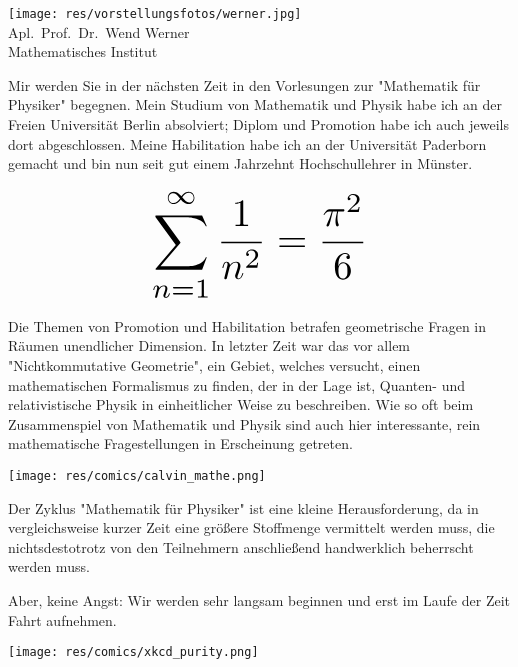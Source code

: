 \begin{multicols}{2}
\begin{center}
\texttt{[image: res/vorstellungsfotos/werner.jpg]}\\
Apl.\ Prof.\ Dr.\ Wend Werner\\
Mathematisches Institut
\end{center}

Mir werden Sie in der nächsten Zeit in den Vorlesungen zur "Mathematik für Physiker" begegnen. Mein Studium von Mathematik und Physik habe ich an der Freien Universität Berlin absolviert; Diplom und Promotion habe ich auch jeweils dort abgeschlossen. Meine Habilitation habe ich an der Universität Paderborn gemacht und bin nun seit gut einem Jahrzehnt Hochschullehrer in Münster.

\[
\resizebox{0.45\hsize}{!}{$\displaystyle\sum_{n = 1}^\infty \frac{1}{n^2} = \frac{\pi^2}{6}$}
\]

Die Themen von Promotion und Habilitation betrafen geometrische Fragen in Räumen unendlicher Dimension. In letzter Zeit war das vor allem "Nichtkommutative Geometrie", ein Gebiet, welches versucht, einen mathematischen Formalismus zu finden, der in der Lage ist, Quanten- und relativistische Physik in einheitlicher Weise zu beschreiben. Wie so oft beim Zusammenspiel von Mathematik und Physik sind auch hier interessante, rein mathematische Fragestellungen in Erscheinung getreten.

\begin{center}
\texttt{[image: res/comics/calvin\_mathe.png]}
\end{center}

Der Zyklus "Mathematik für Physiker" ist eine kleine Herausforderung, da in vergleichsweise kurzer Zeit eine größere Stoffmenge vermittelt werden muss, die nichtsdestotrotz von den Teilnehmern anschließend handwerklich beherrscht werden muss.

Aber, keine Angst: Wir werden sehr langsam beginnen und erst im Laufe der Zeit Fahrt aufnehmen.
\end{multicols}

\medskip

\begin{center}
\texttt{[image: res/comics/xkcd\_purity.png]}
\end{center}

